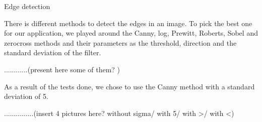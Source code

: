  \begin{flushleft}
 Edge detection
 \end{flushleft}
 
	There is different methods to detect the edges in an image. To pick the best one for our application, we played around the Canny, log, Prewitt, Roberts, Sobel and zerocross methods and their parameters as the threshold, direction and the standard deviation of the filter.

............(present here some of them? )

As a result of the tests done, we chose to use the Canny method with a standard deviation of 5.

...............(insert 4 pictures here? without sigma/ with 5/ with >/ with <)